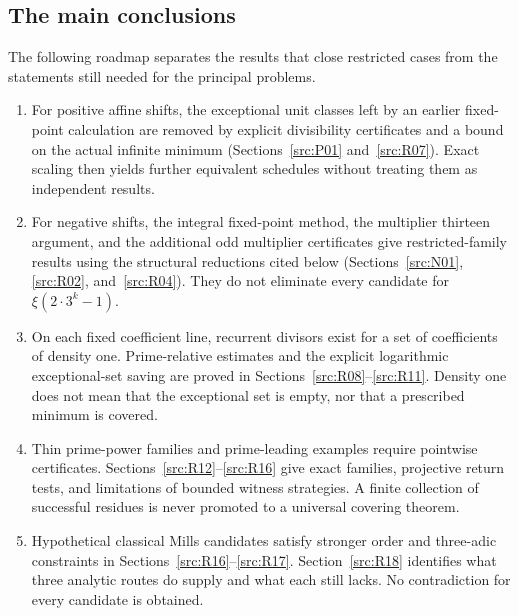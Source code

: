 \documentclass[11pt,a4paper]{article}
\theoremstyle{definition}\newtheorem{definition}[theorem]{Definition}
\theoremstyle{remark}\newtheorem{remark}[theorem]{Remark}
\begin{document}
\subsection{The main conclusions}
The following roadmap separates the results that close restricted cases
from the statements still needed for the principal problems.
\begin{enumerate}
\item For positive affine shifts, the exceptional unit classes left by
an earlier fixed-point calculation are removed by explicit divisibility
certificates and a bound on the actual infinite minimum
(Sections~\ref{src:P01} and~\ref{src:R07}). Exact scaling then yields
further equivalent schedules without treating them as independent results.
\item For negative shifts, the integral fixed-point method, the multiplier
thirteen argument, and the additional odd multiplier certificates give
restricted-family results using the structural reductions cited below (Sections~\ref{src:N01}, \ref{src:R02}, and~\ref{src:R04}). They do
not eliminate every candidate for $\xi(2\cdot3^k-1)$.
\item On each fixed coefficient line, recurrent divisors exist for a set
of coefficients of density one. Prime-relative estimates and the explicit
logarithmic exceptional-set saving are proved in
Sections~\ref{src:R08}--\ref{src:R11}. Density one does not mean that the
exceptional set is empty, nor that a prescribed minimum is covered.
\item Thin prime-power families and prime-leading examples require
pointwise certificates. Sections~\ref{src:R12}--\ref{src:R16} give exact
families, projective return tests, and limitations of bounded witness
strategies. A finite collection of successful residues is never promoted
to a universal covering theorem.
\item Hypothetical classical Mills candidates satisfy stronger order and
three-adic constraints in Sections~\ref{src:R16}--\ref{src:R17}.
Section~\ref{src:R18} identifies what three analytic routes do supply and
what each still lacks. No contradiction for every candidate is obtained.
\end{enumerate}
\end{document}
